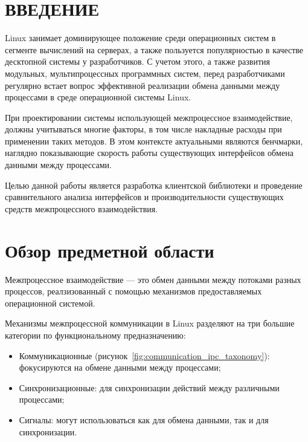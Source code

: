 \documentclass[14pt, russian]{scrartcl}
\newcommand{\refImage}[1]{(рисунок~\ref{#1})}
\newcommand{\anonsection}[1]{\cleardoublepage
\phantomsection
\addcontentsline{toc}{section}{\protect\numberline{}#1}
\section*{#1}\vspace*{2.5ex} %
}
\begin{document}

\setlength{\tabcolsep}{3pt}
\newpage
\setcounter{page}{2}

\newpage
\renewcommand\contentsname{\hfill{\normalfont{СОДЕРЖАНИЕ}}\hfill}  %
\tableofcontents
\newpage
\anonsection{ВВЕДЕНИЕ}  %

Linux занимает доминирующее положение среди операционных систем в сегменте
вычислений на серверах\cite{OSMarketShare}, а также пользуется популярностью в
качестве десктопной системы у разработчиков\cite{DevelopersOS}. С учетом этого,
а также развития модульных, мультипроцессных программных систем, перед
разработчиками регулярно встает вопрос эффективной реализации обмена данными
между процессами в среде операционной системы Linux.

При проектировании системы использующей межпроцессное взаимодействие, должны
учитываться многие факторы, в том числе накладные расходы при применении таких
методов. В этом контексте актуальными являются бенчмарки, наглядно показывающие
скорость работы существующих интерфейсов обмена данными между процессами.

Целью данной работы является разработка клиентской библиотеки и проведение
сравнительного анализа интерфейсов и производительности существующих средств
межпроцессного взаимодействия.

\section{Обзор предметной области}

Межпроцессное взаимодействие --- это обмен данными между потоками разных
процессов, реалзизованный с помощью механизмов
предоставляемых операционной системой.

Механизмы межпроцессной коммуникации в Linux разделяют на три большие категории
по функциональному предназначению:\cite{kerrisk2010linux}

\begin{itemize}
  \item Коммуникационные \refImage{fig:communication_ipc_taxonomy}: фокусируются на
        обмене данными между процессами;
  \item Синхронизационные: для синхронизации действий между различными
        процессами;
  \item Сигналы: могут использоваться как для обмена данными, так и для
        синхронизации.
\end{itemize}
\end{document}
